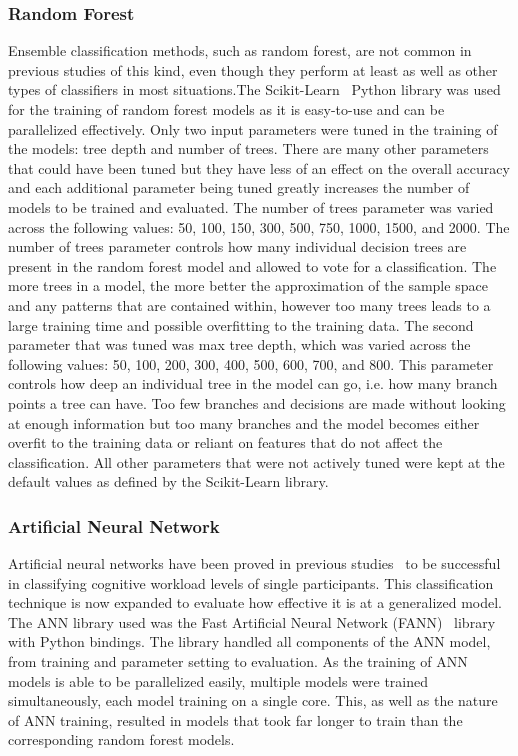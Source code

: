 \documentclass[11pt]{article}
\begin{document}
		\subsubsection{Random Forest}
		Ensemble classification methods, such as random forest, are not common in previous studies of this kind, even though they perform at least as well as other types of classifiers in most situations.The Scikit-Learn~\cite{Scikit} Python library was used for the training of random forest models as it is easy-to-use and can be parallelized effectively. Only two input parameters were tuned in the training of the models: tree depth and number of trees. There are many other parameters that could have been tuned but they have less of an effect on the overall accuracy and each additional parameter being tuned greatly increases the number of models to be trained and evaluated. The number of trees parameter was varied across the following values: 50, 100, 150, 300, 500, 750, 1000, 1500, and 2000. The number of trees parameter controls how many individual decision trees are present in the random forest model and allowed to vote for a classification. The more trees in a model, the more better the approximation of the sample space and any patterns that are contained within, however too many trees leads to a large training time and possible overfitting to the training data. The second parameter that was tuned was max tree depth, which was varied across the following values: 50, 100, 200, 300, 400, 500, 600, 700, and 800. This parameter controls how deep an individual tree in the model can go, i.e. how many branch points a tree can have. Too few branches and decisions are made without looking at enough information but too many branches and the model becomes either overfit to the training data or reliant on features that do not affect the classification. All other parameters that were not actively tuned were kept at the default values as defined by the Scikit-Learn library.
		
		\subsubsection{Artificial Neural Network}
		Artificial neural networks have been proved in previous studies~\cite{Wilson, Estepp_2015} to be successful in classifying cognitive workload levels of single participants. This classification technique is now expanded to evaluate how effective it is at a generalized model. The ANN library used was the Fast Artificial Neural Network (FANN)~\cite{FANN} library with Python bindings. The library handled all components of the ANN model, from training and parameter setting to evaluation. As the training of ANN models is able to be parallelized easily, multiple models were trained simultaneously, each model training on a single core. This, as well as the nature of ANN training, resulted in models that took far longer to train than the corresponding random forest models.
		
\end{document}
